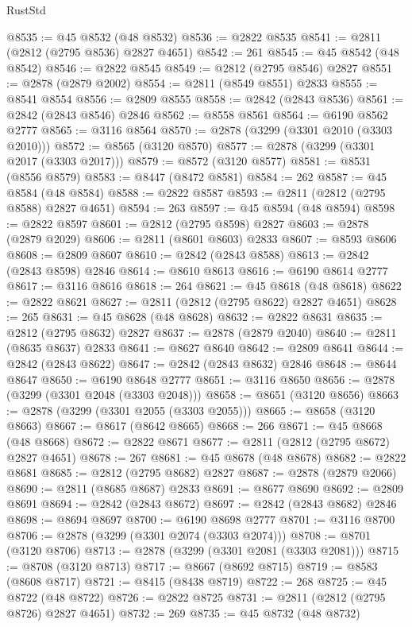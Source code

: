 \begin{lexlean}{RustStd}
\begin{coremodule}
{\begin{coremodule}
{{{{{{{{{{{{{{{{{{{{{{{{{{{{{{{{{@8535 := @45 @8532 (@48 @8532)
@8536 := @2822 @8535
@8541 := @2811 (@2812 (@2795 @8536) @2827 @4651)
@8542 := 261
@8545 := @45 @8542 (@48 @8542)
@8546 := @2822 @8545
@8549 := @2812 (@2795 @8546) @2827
@8551 := @2878 (@2879 @2002)
@8554 := @2811 (@8549 @8551) @2833
@8555 := @8541 @8554
@8556 := @2809 @8555
@8558 := @2842 (@2843 @8536)
@8561 := @2842 (@2843 @8546) @2846
@8562 := @8558 @8561
@8564 := @6190 @8562 @2777
@8565 := @3116 @8564
@8570 := @2878 (@3299 (@3301 @2010 (@3303 @2010)))
@8572 := @8565 (@3120 @8570)
@8577 := @2878 (@3299 (@3301 @2017 (@3303 @2017)))
@8579 := @8572 (@3120 @8577)
@8581 := @8531 (@8556 @8579)
@8583 := @8447 (@8472 @8581)
@8584 := 262
@8587 := @45 @8584 (@48 @8584)
@8588 := @2822 @8587
@8593 := @2811 (@2812 (@2795 @8588) @2827 @4651)
@8594 := 263
@8597 := @45 @8594 (@48 @8594)
@8598 := @2822 @8597
@8601 := @2812 (@2795 @8598) @2827
@8603 := @2878 (@2879 @2029)
@8606 := @2811 (@8601 @8603) @2833
@8607 := @8593 @8606
@8608 := @2809 @8607
@8610 := @2842 (@2843 @8588)
@8613 := @2842 (@2843 @8598) @2846
@8614 := @8610 @8613
@8616 := @6190 @8614 @2777
@8617 := @3116 @8616
@8618 := 264
@8621 := @45 @8618 (@48 @8618)
@8622 := @2822 @8621
@8627 := @2811 (@2812 (@2795 @8622) @2827 @4651)
@8628 := 265
@8631 := @45 @8628 (@48 @8628)
@8632 := @2822 @8631
@8635 := @2812 (@2795 @8632) @2827
@8637 := @2878 (@2879 @2040)
@8640 := @2811 (@8635 @8637) @2833
@8641 := @8627 @8640
@8642 := @2809 @8641
@8644 := @2842 (@2843 @8622)
@8647 := @2842 (@2843 @8632) @2846
@8648 := @8644 @8647
@8650 := @6190 @8648 @2777
@8651 := @3116 @8650
@8656 := @2878 (@3299 (@3301 @2048 (@3303 @2048)))
@8658 := @8651 (@3120 @8656)
@8663 := @2878 (@3299 (@3301 @2055 (@3303 @2055)))
@8665 := @8658 (@3120 @8663)
@8667 := @8617 (@8642 @8665)
@8668 := 266
@8671 := @45 @8668 (@48 @8668)
@8672 := @2822 @8671
@8677 := @2811 (@2812 (@2795 @8672) @2827 @4651)
@8678 := 267
@8681 := @45 @8678 (@48 @8678)
@8682 := @2822 @8681
@8685 := @2812 (@2795 @8682) @2827
@8687 := @2878 (@2879 @2066)
@8690 := @2811 (@8685 @8687) @2833
@8691 := @8677 @8690
@8692 := @2809 @8691
@8694 := @2842 (@2843 @8672)
@8697 := @2842 (@2843 @8682) @2846
@8698 := @8694 @8697
@8700 := @6190 @8698 @2777
@8701 := @3116 @8700
@8706 := @2878 (@3299 (@3301 @2074 (@3303 @2074)))
@8708 := @8701 (@3120 @8706)
@8713 := @2878 (@3299 (@3301 @2081 (@3303 @2081)))
@8715 := @8708 (@3120 @8713)
@8717 := @8667 (@8692 @8715)
@8719 := @8583 (@8608 @8717)
@8721 := @8415 (@8438 @8719)
@8722 := 268
@8725 := @45 @8722 (@48 @8722)
@8726 := @2822 @8725
@8731 := @2811 (@2812 (@2795 @8726) @2827 @4651)
@8732 := 269
@8735 := @45 @8732 (@48 @8732)
}}}}}}}}}}}}}}}}}}}}}}}}}}}}}}}}}
\end{coremodule}}
\end{coremodule}
\end{lexlean}
